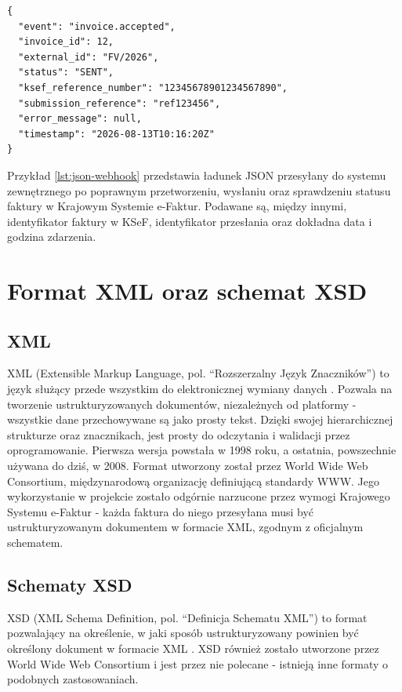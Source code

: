\begin{lstlisting}[style=thesiscode, caption={Przykładowa informacja zwrotna (webhook) w formacie JSON przesyłana do systemu zewnętrznego po poprawnym przetworzeniu faktury}, label={lst:json-webhook}]
{
  "event": "invoice.accepted",
  "invoice_id": 12,
  "external_id": "FV/2026",
  "status": "SENT",
  "ksef_reference_number": "12345678901234567890",
  "submission_reference": "ref123456",
  "error_message": null,
  "timestamp": "2026-08-13T10:16:20Z"
}
\end{lstlisting}

Przykład \ref{lst:json-webhook} przedstawia ładunek JSON przesyłany do systemu zewnętrznego po poprawnym przetworzeniu, wysłaniu oraz sprawdzeniu statusu faktury w Krajowym Systemie e-Faktur. Podawane są, między innymi, identyfikator faktury w KSeF, identyfikator przesłania oraz dokładna data i godzina zdarzenia.

\section{Format XML oraz schemat XSD}
\subsection{XML}
XML (Extensible Markup Language, pol. \enquote{Rozszerzalny Język Znaczników}) to język służący przede wszystkim do elektronicznej wymiany danych \parencite{w3c_xml}. Pozwala na tworzenie ustrukturyzowanych dokumentów, niezależnych od platformy - wszystkie dane przechowywane są jako prosty tekst. Dzięki swojej hierarchicznej strukturze oraz znacznikach, jest prosty do odczytania i walidacji przez oprogramowanie. Pierwsza wersja powstała w 1998 roku, a ostatnia, powszechnie używana do dziś, w 2008. Format utworzony został przez World Wide Web Consortium, międzynarodową organizację definiującą standardy WWW. Jego wykorzystanie w projekcie zostało odgórnie narzucone przez wymogi Krajowego Systemu e-Faktur - każda faktura do niego przesyłana musi być ustrukturyzowanym dokumentem w formacie XML, zgodnym z oficjalnym schematem.

\subsection{Schematy XSD}
XSD (XML Schema Definition, pol. \enquote{Definicja Schematu XML}) to format pozwalający na określenie, w jaki sposób ustrukturyzowany powinien być określony dokument w formacie XML \parencite{w3c_xsd}. XSD również zostało utworzone przez World Wide Web Consortium i jest przez nie polecane - istnieją inne formaty o podobnych zastosowaniach.

